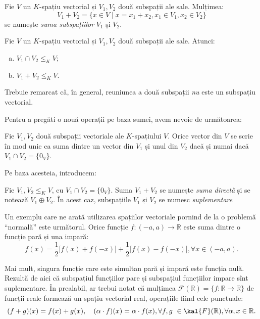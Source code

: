 \begin{definition}
Fie $V$ un $K$-spațiu vectorial și $V_1, V_2$ două subspații ale sale. 
Mulțimea: 
\[
V_1 + V_2 = \{ x \in V \mid x = x_1 + x_2, x_1 \in V_1, x_2 \in V_2 \}
\]
se numește \emph{suma subspațiilor} $V_1$ și $V_2$.
\end{definition}
\begin{proposition}
Fie $V$ un $K$-spațiu vectorial și $V_1, V_2$ două subspații ale sale. 
Atunci:
\begin{enumerate}[(a)]
\item $V_1 \cap V_2 \leq_K V$;
\item $V_1 + V_2 \leq_K V$.
\end{enumerate}
\end{proposition}

Trebuie remarcat că, în general, reuniunea a două subspații \emph{nu} este un 
subspațiu vectorial.

Pentru a pregăti o nouă operații pe baza sumei, avem nevoie de următoarea:
\begin{proposition}
Fie $V_1, V_2$ două subspații vectoriale ale $K$-spațiului $V$. Orice 
vector din $V$ se scrie în mod unic ca suma dintre un vector din $V_1$ și 
unul din $V_2$ dacă și numai dacă $V_1 \cap V_2 = \{ 0_V \}$.
\end{proposition}

Pe baza acesteia, introducem:
\begin{definition}
Fie $V_1, V_2 \leq_K V$, cu $V_1 \cap V_2 = \{ 0_V \}$. Suma $V_1 + V_2$ se 
numește \emph{suma directă} și se notează $V_1 \oplus V_2$. În acest caz, 
subspațiile $V_1$ și $V_2$ se numesc \emph{suplementare}
\end{definition}

Un exemplu care ne arată utilizarea spațiilor vectoriale pornind de la o 
problemă \enquote{normală} este următorul. Orice funcție 
$f : (-a, a) \to \mathbb{R}$ este suma dintre o funcție pară și una impară: 
\[
f(x) = \dfrac{1}{2} \big[ f(x) + f(-x) \big] + \dfrac{1}{2} 
\big[ f(x) - f(-x) \big], \forall x \in (-a, a).
\]

Mai mult, singura funcție care este simultan pară și impară este funcția nulă. 
Rezultă de aici că subspațiul funcțiilor pare și subspațiul funcțiilor impare 
sînt suplementare. În prealabil, ar trebui notat că mulțimea 
$\mathcal{F}(\mathbb{R}) = \{f : \mathbb{R} \to \mathbb{R}\}$ de funcții 
reale formează un spațiu vectorial real, operațiile fiind cele punctuale: 
\[
(f + g)(x) = f(x) + g(x), \quad (\alpha \cdot f)(x) = \alpha \cdot f(x), 
\forall f,g \in \kal{F}(\mathbb{R}), \forall \alpha, x \in \mathbb{R}.
\]

